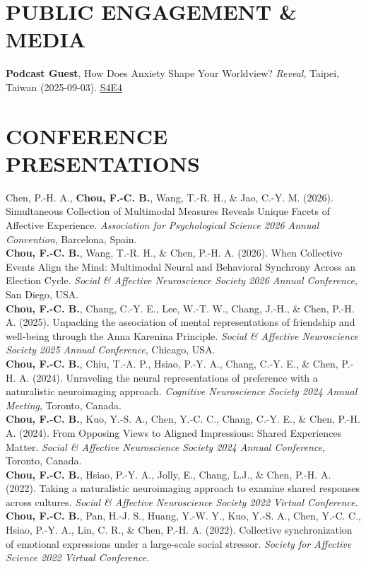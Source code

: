 \documentclass[a4paper,12pt]{article}
\newcommand{\sectionspace}{0pt} %
\newcommand{\itemspace}{7pt} %
\begin{document}
\vspace{\sectionspace}

\section*{PUBLIC ENGAGEMENT \& MEDIA}
\noindent\textbf{Podcast Guest}, How Does Anxiety Shape Your Worldview? \textit{Reveal}, Taipei, Taiwan (2025-09-03). \href{https://podcasts.apple.com/tw/podcast/%E9%87%8D%E6%95%B4%E8%A9%95%E4%BC%B0/id1747099567?l=en-GB&i=1000724790000}{S4E4} \\[\itemspace]

\vspace{\sectionspace}

\section*{CONFERENCE PRESENTATIONS}
\noindent Chen, P.-H. A., \textbf{Chou, F.-C. B.}, Wang, T.-R. H., \& Jao, C.-Y. M. (2026). Simultaneous Collection of Multimodal Measures Reveals Unique Facets of Affective Experience. \textit{Association for Psychological Science 2026 Annual Convention}, Barcelona, Spain. \\[\itemspace]
\noindent\textbf{Chou, F.-C. B.}, Wang, T.-R. H., \& Chen, P.-H. A. (2026). When Collective Events Align the Mind: Multimodal Neural and Behavioral Synchrony Across an Election Cycle. \textit{Social \& Affective Neuroscience Society 2026 Annual Conference}, San Diego, USA. \\[\itemspace]
\noindent\textbf{Chou, F.-C. B.}, Chang, C.-Y. E., Lee, W.-T. W., Chang, J.-H., \& Chen, P.-H. A. (2025). Unpacking the association of mental representations of friendship and well-being through the Anna Karenina Principle. \textit{Social \& Affective Neuroscience Society 2025 Annual Conference}, Chicago, USA. \\[\itemspace]
\noindent\textbf{Chou, F.-C. B.}, Chiu, T.-A. P., Hsiao, P.-Y. A., Chang, C.-Y. E., \& Chen, P.-H. A. (2024). Unraveling the neural representations of preference with a naturalistic neuroimaging approach. \textit{Cognitive Neuroscience Society 2024 Annual Meeting}, Toronto, Canada.\\[\itemspace]
\noindent\textbf{Chou, F.-C. B.}, Kuo, Y.-S. A., Chen, Y.-C. C., Chang, C.-Y. E., \& Chen, P.-H. A. (2024). From Opposing Views to Aligned Impressions: Shared Experiences Matter. \textit{Social \& Affective Neuroscience Society 2024 Annual Conference}, Toronto, Canada. \\[\itemspace]
\noindent\textbf{Chou, F.-C. B.}, Hsiao, P.-Y. A., Jolly, E., Chang, L.J., \& Chen, P.-H. A. (2022). Taking a naturalistic neuroimaging approach to examine shared responses across cultures. \textit{Social \& Affective Neuroscience Society 2022 Virtual Conference}.\\[\itemspace]
\noindent\textbf{Chou, F.-C. B.}, Pan, H.-J. S., Huang, Y.-W. Y., Kuo, Y.-S. A., Chen, Y.-C. C., Hsiao, P.-Y. A., Lin, C. R., \& Chen, P.-H. A. (2022). Collective synchronization of emotional expressions under a large-scale social stressor. \textit{Society for Affective Science 2022 Virtual Conference}.\\[\itemspace]
\end{document}
